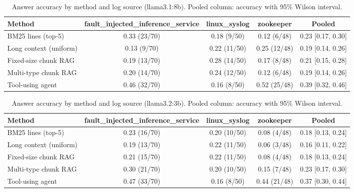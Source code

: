 \begin{table}[t]
\centering
\caption{Answer accuracy by method and log source (llama3.1:8b). Pooled column: accuracy with 95\% Wilson interval.}
\label{tab:main_comparison__llama3_1_8b}
\begin{tabular}{@{}lcccc@{}}
\toprule
Method & fault\_injected\_inference\_service & linux\_syslog & zookeeper & Pooled \\
\midrule
BM25 lines (top-5) & 0.33 (23/70) & 0.18 (9/50) & 0.12 (6/48) & 0.23 [0.17, 0.30] \\
Long context (uniform) & 0.13 (9/70) & 0.22 (11/50) & 0.25 (12/48) & 0.19 [0.14, 0.26] \\
Fixed-size chunk RAG & 0.19 (13/70) & 0.28 (14/50) & 0.17 (8/48) & 0.21 [0.15, 0.28] \\
Multi-type chunk RAG & 0.20 (14/70) & 0.24 (12/50) & 0.12 (6/48) & 0.19 [0.14, 0.26] \\
Tool-using agent & 0.46 (32/70) & 0.16 (8/50) & 0.52 (25/48) & 0.39 [0.32, 0.46] \\
\bottomrule
\end{tabular}
\end{table}

\begin{table}[t]
\centering
\caption{Answer accuracy by method and log source (llama3.2:3b). Pooled column: accuracy with 95\% Wilson interval.}
\label{tab:main_comparison__llama3_2_3b}
\begin{tabular}{@{}lcccc@{}}
\toprule
Method & fault\_injected\_inference\_service & linux\_syslog & zookeeper & Pooled \\
\midrule
BM25 lines (top-5) & 0.23 (16/70) & 0.20 (10/50) & 0.08 (4/48) & 0.18 [0.13, 0.24] \\
Long context (uniform) & 0.19 (13/70) & 0.22 (11/50) & 0.06 (3/48) & 0.16 [0.11, 0.22] \\
Fixed-size chunk RAG & 0.21 (15/70) & 0.22 (11/50) & 0.08 (4/48) & 0.18 [0.13, 0.24] \\
Multi-type chunk RAG & 0.30 (21/70) & 0.20 (10/50) & 0.15 (7/48) & 0.23 [0.17, 0.30] \\
Tool-using agent & 0.47 (33/70) & 0.16 (8/50) & 0.44 (21/48) & 0.37 [0.30, 0.44] \\
\bottomrule
\end{tabular}
\end{table}

